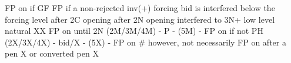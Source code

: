 FP on if GF
FP if a non-rejected inv(+) forcing bid is interfered below the forcing level  
after 2C opening
after 2N opening interfered to 3N+
low level natural XX FP on until 2N
(2M/3M/4M) - P - (5M) - FP on if not PH
(2X/3X/4X) - bid/X - (5X) - FP on
# however, not necessarily FP on after a pen X or converted pen X